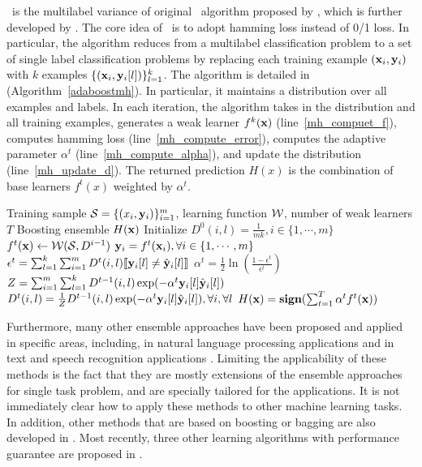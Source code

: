 {\adaboostmh\ is the multilabel variance of original \adaboost\ algorithm proposed by \citet{Schapire99improved}, which is further developed by \citet{Esuli2008boosting}.
The core idea of \adaboostmh\ is to adopt hamming loss instead of 0/1 loss. 
In particular, the algorithm reduces from a multilabel classification problem to a set of single label classification problems by replacing each training example $(\mathbf {x}_i,\mathbf {y}_i)$ with $k$ examples $\{(\mathbf {x}_i,\mathbf {y}_i[l])\}_{l=1}^k$.
The algorithm is detailed in (Algorithm~\ref{adaboostmh}).
In particular, it maintains a distribution over all examples and labels.
In each iteration, the algorithm takes in the distribution and all training examples, generates a weak learner $f^k(\mathbf {x})$ (line~\ref{mh_compuet_f}), computes hamming loss (line~\ref{mh_compute_error}), computes the adaptive parameter $\alpha^t$ (line~\ref{mh_compute_alpha}), and update the distribution (line~\ref{mh_update_d}).
The returned prediction $H(x)$ is the combination of base learners $f^t(x)$ weighted by $\alpha^t$.
\begin{algorithm}
\caption{\adaboostmh}
\label{adaboostmh}
\begin{algorithmic}[1]
	\REQUIRE Training sample $\mathcal{S} = \{(x_i,\mathbf {y}_i)\}_{i=1}^m$, learning function $\mathcal{W}$, number of weak learners $T$
	\ENSURE Boosting ensemble $H(\mathbf {x})$
	\STATE Initialize $D^0(i,l)=\frac{1}{mk},i\in\{1,\cdots,m\}$
		\STATE $f^t(\mathbf {x})\leftarrow\mathcal{W}(\mathcal{S},D^{i-1})$ \label{mh_compuet_f}
		\STATE $\mathbf {y}_i = f^t(\mathbf {x}_i),\forall i\in\{1,\cdots,m\}$
		\STATE $\epsilon^t =\sum_{l=1}^k\sum_{i=1}^{m}D^t(i,l){\llbracket \mathbf {y}_i[l]\neq\hat{\mathbf {y}}_i[l] \rrbracket}$ \label{mh_compute_error}
		\STATE $\alpha^{t} = \frac{1}{2}\ln\left(\frac{1-\epsilon^t}{\epsilon^t}\right)$ \label{mh_compute_alpha}
		\STATE $Z=\sum_{i=1}^{m}\sum_{l=1}^{k}D^{t-1}(i,l)\exp(-\alpha^t\mathbf {y}_i[l]\hat{\mathbf {y}}_i[l])$
		\STATE $D^t(i,l) = \frac{1}{Z}D^{t-1}(i,l)\exp(-\alpha^t\mathbf {y}_i[l]\hat{\mathbf {y}}_i[l]),\forall i,\forall l$ \label{mh_update_d}
	\ENDFOR
	\RETURN $H(\mathbf {x}) = \textbf{sign}(\sum_{t=1}^T\alpha^tf^t(\mathbf {x}))$
\end{algorithmic}
\end{algorithm}

Furthermore, many other ensemble approaches have been proposed and applied in specific areas, including, in natural language processing applications \citep{Collins05distrimnative,Zeman05improving,Sagae06parsing,Zhang09kbest} and 
in text and speech recognition applications \citep{Fiscus97a,Benesty08speech,Petrov10products}.
Limiting the applicability of these methods is the fact that they are mostly extensions of the ensemble approaches for single task problem, and are specially tailored for the applications.
It is not immediately clear how to apply these methods to other machine learning tasks.
In addition, other methods that are based on boosting or bagging are also developed in \citep{Wang07simple,Kocev13tree}.
Most recently, three other learning algorithms with performance guarantee are proposed in \citep{Cortes14semble}.

}

